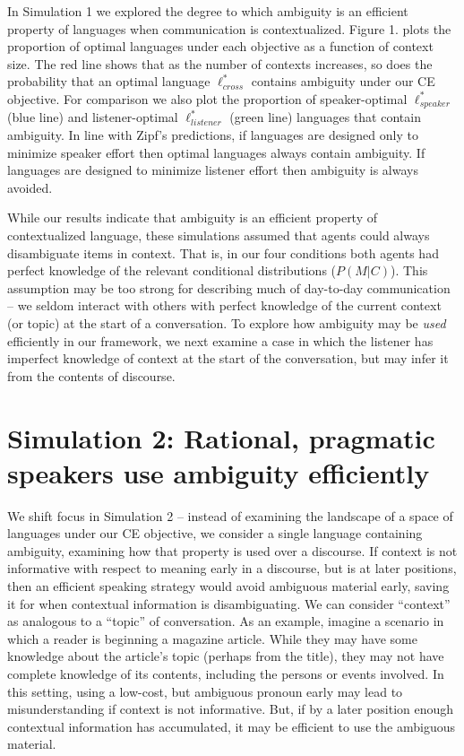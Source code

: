 \documentclass[10pt, letterpaper]{article}
\begin{document}
In Simulation 1 we explored the degree to which ambiguity is an
efficient property of languages when communication is contextualized.
Figure 1. plots the proportion of optimal languages under each objective
as a function of context size. The red line shows that as the number of
contexts increases, so does the probability that an optimal language
\(\ell^*_{cross}\) contains ambiguity under our CE objective. For
comparison we also plot the proportion of speaker-optimal
\(\ell^*_{speaker}\) (blue line) and listener-optimal
\(\ell^*_{listener}\) (green line) languages that contain ambiguity. In
line with Zipf's predictions, if languages are designed only to minimize
speaker effort then optimal languages always contain ambiguity. If
languages are designed to minimize listener effort then ambiguity is
always avoided.\par

While our results indicate that ambiguity is an efficient property of
contextualized language, these simulations assumed that agents could
always disambiguate items in context. That is, in our four conditions
both agents had perfect knowledge of the relevant conditional
distributions (\(P(M|C)\)). This assumption may be too strong for
describing much of day-to-day communication -- we seldom interact with
others with perfect knowledge of the current context (or topic) at the
start of a conversation. To explore how ambiguity may be \textit{used}
efficiently in our framework, we next examine a case in which the
listener has imperfect knowledge of context at the start of the
conversation, but may infer it from the contents of discourse.\par

\section{Simulation 2: Rational, pragmatic speakers use ambiguity
efficiently}\label{simulation-2-rational-pragmatic-speakers-use-ambiguity-efficiently}

We shift focus in Simulation 2 -- instead of examining the landscape of
a space of languages under our CE objective, we consider a single
language containing ambiguity, examining how that property is used over
a discourse. If context is not informative with respect to meaning early
in a discourse, but is at later positions, then an efficient speaking
strategy would avoid ambiguous material early, saving it for when
contextual information is disambiguating. We can consider ``context'' as
analogous to a ``topic'' of conversation. As an example, imagine a
scenario in which a reader is beginning a magazine article. While they
may have some knowledge about the article's topic (perhaps from the
title), they may not have complete knowledge of its contents, including
the persons or events involved. In this setting, using a low-cost, but
ambiguous pronoun early may lead to misunderstanding if context is not
informative. But, if by a later position enough contextual information
has accumulated, it may be efficient to use the ambiguous material.\par
\end{document}
